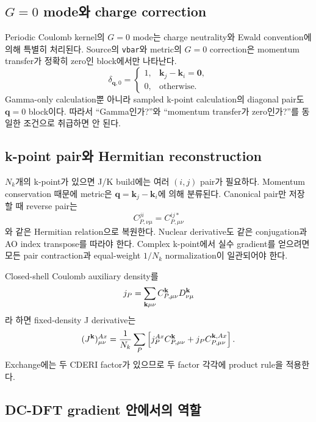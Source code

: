 \subsection{\texorpdfstring{$G=0$}{G=0} mode와 charge correction}

Periodic Coulomb kernel의 $G=0$ mode는 charge neutrality와 Ewald convention에 의해
특별히 처리된다. Source의 \texttt{vbar}와 metric의 $G=0$ correction은 momentum transfer가
정확히 zero인 block에서만 나타난다.
\begin{equation}
 \delta_{\mathbf q,0}=\begin{cases}
 1,& \mathbf k_j-\mathbf k_i=\mathbf 0,\\
 0,& \text{otherwise}.
 \end{cases}
\end{equation}
Gamma-only calculation뿐 아니라 sampled k-point calculation의 diagonal pair도
$\mathbf q=0$ block이다. 따라서 ``Gamma인가?''와 ``momentum transfer가 zero인가?''를
동일한 조건으로 취급하면 안 된다.

\subsection{k-point pair와 Hermitian reconstruction}

$N_k$개의 k-point가 있으면 J/K build에는 여러 $(i,j)$ pair가 필요하다. Momentum
conservation 때문에 metric은 $\mathbf q=\mathbf k_j-\mathbf k_i$에 의해 분류된다.
Canonical pair만 저장할 때 reverse pair는
\begin{equation}
 C^{ji}_{P,\nu\mu}=C^{ij*}_{P,\mu\nu}
\end{equation}
와 같은 Hermitian relation으로 복원한다. Nuclear derivative도 같은 conjugation과 AO
index transpose를 따라야 한다. Complex k-point에서 실수 gradient를 얻으려면 모든
pair contraction과 equal-weight $1/N_k$ normalization이 일관되어야 한다.

Closed-shell Coulomb auxiliary density를
\begin{equation}
 j_P=\sum_{\mathbf{k}\mu\nu}C^{\mathbf{k}}_{P,\mu\nu}D^{\mathbf{k}}_{\nu\mu}
\end{equation}
라 하면 fixed-density J derivative는
\begin{equation}
 (J^{\mathbf{k}})^{Ax}_{\mu\nu}
 =\frac{1}{N_k}\sum_P
 \left[j_P^{Ax}C^{\mathbf{k}}_{P,\mu\nu}
 +j_PC^{\mathbf{k},Ax}_{P,\mu\nu}\right].
\end{equation}
Exchange에는 두 CDERI factor가 있으므로 두 factor 각각에 product rule을 적용한다.

\subsection{DC-DFT gradient 안에서의 역할}


